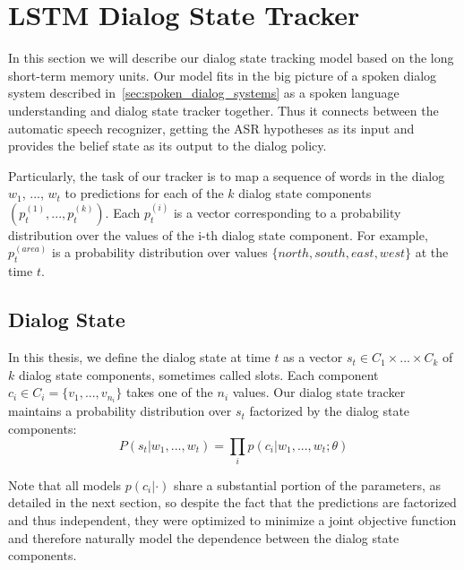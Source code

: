 \documentclass[runningheads,a4paper]{llncs}
\begin{document}
\section{LSTM Dialog State Tracker}
\label{sec:lstm_dialog_state_tracker}
In this section we will describe our dialog state tracking model based on the long short-term memory units. Our model fits in the big picture of a spoken dialog system described in~\autoref{sec:spoken_dialog_systems} as a spoken language understanding and dialog state tracker together. Thus it connects between the automatic speech recognizer, getting the ASR hypotheses as its input and provides the belief state as its output to the dialog policy.

Particularly, the task of our tracker is to map a sequence of words in the dialog $w_1$, ..., $w_t$ to predictions for each of the $k$ dialog state components $(p^{(1)}_t, ..., p^{(k)}_t)$. Each $p^{(i)}_t$ is a vector corresponding to a probability distribution over the values of the i-th dialog state component. For example, $p^{(area)}_t$ is a probability distribution over values $\{north, south, east, west\}$ at the time $t$.

\subsection{Dialog State}
In this thesis, we define the dialog state at time $t$ as a vector $s_t \in C_1 \times ... \times C_k$ of $k$ dialog state components, sometimes called slots. Each component $c_i \in C_i=\{v_1, ..., v_{n_i}\}$ takes one of the $n_i$ values. Our dialog state tracker maintains a probability distribution over $s_t$ factorized by the dialog state components:
$$P(s_t|w_1, ..., w_t)=\prod_i p(c_i|w_1, ..., w_t; \theta)$$

Note that all models $p(c_i|\cdot)$ share a substantial portion of the parameters, as detailed in the next section, so despite the fact that the predictions are factorized and thus independent, they were optimized to minimize a joint objective function and therefore naturally model the dependence between the dialog state components.
\end{document}
